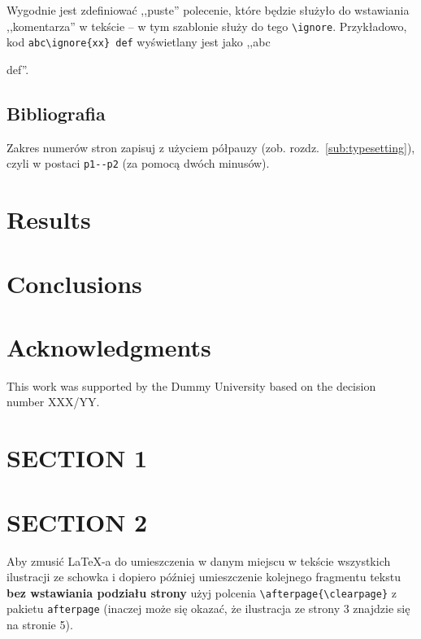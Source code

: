 \documentclass[pdftex,11pt,a4paper]{article}
\begin{document}
\par\bigskip

Wygodnie jest zdefiniować ,,puste'' polecenie, które będzie służyło do wstawiania ,,komentarza'' w tekście -- w tym szablonie służy do tego \lstinline|\ignore|. Przykładowo, kod \lstinline|abc\ignore{xx} def| wyświetlany jest jako ,,abc def''.


\subsection{Bibliografia}

Zakres numerów stron zapisuj z użyciem półpauzy (zob. rozdz.~\ref{sub:typesetting}), czyli w postaci \lstinline|p1--p2| (za pomocą dwóch minusów).

\section{Results}

\section{Conclusions}


\section*{Acknowledgments}

This work was supported by the Dummy University based on the decision number XXX/YY.


\appendix

\section{SECTION 1}

\section{SECTION 2}


Aby zmusić \LaTeX-a do umieszczenia w danym miejscu w tekście wszystkich ilustracji ze schowka i dopiero później umieszczenie kolejnego fragmentu tekstu \textbf{bez wstawiania podziału strony} użyj polcenia \lstinline|\afterpage{\clearpage}| z pakietu \lstinline|afterpage| (inaczej może się okazać, że ilustracja ze strony 3 znajdzie się na stronie 5\textellipsis).

\afterpage{\clearpage}  %


\printbibliography
\end{document}
